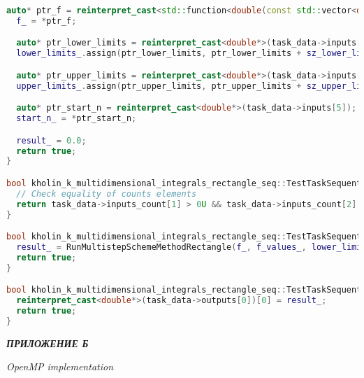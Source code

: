\documentclass[14pt,a4paper]{article}
\begin{document}
\begin{framed}
\begin{lstlisting}[language=C++]
  auto* ptr_f = reinterpret_cast<std::function<double(const std::vector<double>&)>*>(task_data->inputs[2]);
  f_ = *ptr_f;

  auto* ptr_lower_limits = reinterpret_cast<double*>(task_data->inputs[3]);
  lower_limits_.assign(ptr_lower_limits, ptr_lower_limits + sz_lower_limits_);

  auto* ptr_upper_limits = reinterpret_cast<double*>(task_data->inputs[4]);
  upper_limits_.assign(ptr_upper_limits, ptr_upper_limits + sz_upper_limits_);

  auto* ptr_start_n = reinterpret_cast<double*>(task_data->inputs[5]);
  start_n_ = *ptr_start_n;

  result_ = 0.0;
  return true;
}

bool kholin_k_multidimensional_integrals_rectangle_seq::TestTaskSequential::ValidationImpl() {
  // Check equality of counts elements
  return task_data->inputs_count[1] > 0U && task_data->inputs_count[2] > 0U;
}

bool kholin_k_multidimensional_integrals_rectangle_seq::TestTaskSequential::RunImpl() {
  result_ = RunMultistepSchemeMethodRectangle(f_, f_values_, lower_limits_, upper_limits_, dim_, start_n_);
  return true;
}

bool kholin_k_multidimensional_integrals_rectangle_seq::TestTaskSequential::PostProcessingImpl() {
  reinterpret_cast<double*>(task_data->outputs[0])[0] = result_;
  return true;
}

\end{lstlisting}
\end{framed}


\newpage

{\raggedright\textit{\large\bfseries ПРИЛОЖЕНИЕ Б}\par}

\textit{OpenMP implementation}
\end{document}
